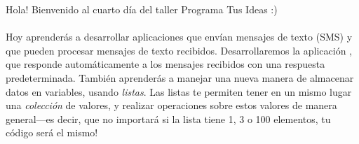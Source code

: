 Hola! Bienvenido al cuarto día del taller Programa Tus Ideas :)

\paragraph{}
Hoy aprenderás a desarrollar aplicaciones que envían mensajes de texto
(SMS) y que pueden procesar mensajes de texto
recibidos. Desarrollaremos la aplicación ,
que responde automáticamente a los mensajes recibidos con una
respuesta predeterminada. También aprenderás a manejar una nueva
manera de almacenar datos en variables, usando \emph{listas}. Las
listas te permiten tener en un mismo lugar una \emph{colección} de
valores, y realizar operaciones sobre estos valores de manera
general---es decir, que no importará si la lista tiene 1, 3 o 100
elementos, tu código será el mismo!
